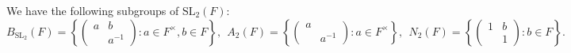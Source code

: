 \documentclass[11pt]{amsart}
\theoremstyle{definition}
\theoremstyle{remark}
\begin{document}
We have the following subgroups of $\mathrm{SL}_2(F)$:
\begin{equation*}
B_{\mathrm{SL}_2}(F)= \left\{ \left(\begin{smallmatrix} a & b \\ & a^{-1}\end{smallmatrix}\right): a\in F^\times, b\in F \right\}, \ \ 
A_2(F)=\left\{ \left(\begin{smallmatrix} a & \\ & a^{-1}\end{smallmatrix}\right):a\in F^\times \right\}, \ \  N_2(F)=\left\{ \left(\begin{smallmatrix} 1 & b\\ & 1\end{smallmatrix}\right):b\in F \right\} .
\end{equation*}
\end{document}
